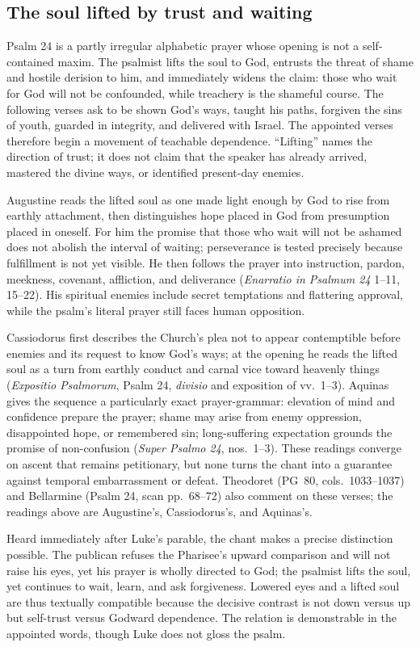 \subsection*{The soul lifted by trust and waiting\enspace{}}

Psalm 24 is a partly irregular alphabetic prayer whose opening is not a
self-contained maxim.
The psalmist lifts the soul to God, entrusts the threat of shame and hostile
derision to him, and immediately widens the claim: those who wait for God will
not be confounded, while treachery is the shameful course. The following
verses ask to be shown God's ways, taught his paths, forgiven the sins of
youth, guarded in integrity, and delivered with Israel. The appointed verses
therefore begin a movement of teachable dependence. ``Lifting'' names the
direction of trust; it does not claim that the speaker has already arrived,
mastered the divine ways, or identified present-day enemies.

Augustine reads the lifted soul as one made light enough by God to rise from
earthly attachment, then distinguishes hope placed in God from presumption
placed in oneself. For him the promise that those who wait will not be ashamed
does not abolish the interval of waiting; perseverance is tested precisely
because fulfillment is not yet visible. He then follows the prayer into
instruction, pardon, meekness, covenant, affliction, and deliverance
(\emph{Enarratio in Psalmum 24} 1--11, 15--22). His spiritual enemies include
secret temptations and flattering approval, while the psalm's literal prayer
still faces human opposition.

Cassiodorus first describes the Church's plea not to appear contemptible
before enemies and its request to know God's ways; at the opening he reads the
lifted soul as a turn from earthly conduct and carnal vice toward heavenly
things (\emph{Expositio Psalmorum}, Psalm 24, \emph{divisio} and exposition
of vv.~1--3). Aquinas gives the sequence a particularly exact prayer-grammar:
elevation of mind and confidence prepare the prayer; shame may arise from
enemy oppression, disappointed hope, or remembered sin; long-suffering
expectation grounds the promise of non-confusion (\emph{Super Psalmo 24},
nos.~1--3). These readings converge on ascent that remains petitionary, but
none turns the chant into a guarantee against temporal embarrassment or
defeat. Theodoret (PG~80, cols.~1033--1037) and Bellarmine (Psalm 24, scan
pp.~68--72) also comment on these verses; the readings above are Augustine's,
Cassiodorus's, and Aquinas's.

Heard immediately after Luke's parable, the chant makes a precise distinction
possible. The publican refuses the Pharisee's upward comparison and will not
raise his eyes, yet his prayer is wholly directed to God; the psalmist lifts
the soul, yet continues to wait, learn, and ask forgiveness. Lowered eyes and
a lifted soul are thus textually compatible because the decisive contrast is
not down versus up but self-trust versus Godward dependence. The relation is
demonstrable in the appointed words, though Luke does not gloss the psalm.

